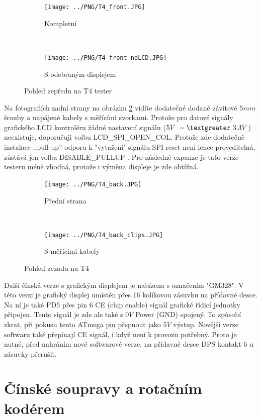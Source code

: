 \begin{figure}[H]
  \begin{subfigure}[b]{.5\textwidth}
    \centering
    \texttt{[image: ../PNG/T4\_front.JPG]}
    \caption{Kompletní}
  \end{subfigure}
  ~
  \begin{subfigure}[b]{.5\textwidth}
    \centering
    \texttt{[image: ../PNG/T4\_front\_noLCD.JPG]}
    \caption{S odebraným displejem}
  \end{subfigure}
  \caption{Pohled zepředu na T4 tester}
  \label{fig:T4_front}
\end{figure}

Na fotografiích zadní strany na obrázku \ref{fig:T4_back} vidíte dodatečné dodané
závitové \(5mm\) šrouby a napájené kabely s měřícími svorkami.
Protože pro datové signály grafického LCD kontroléru žádné nastavení
signálu (\(5V~-\textgreater ~3.3V\)) neexistuje, doporučuji volbu LCD\_SPI\_OPEN\_COL.
Protože zde dodatečně instalace ,,pull-up'' odporu k "vytažení" signálu SPI reset
není lehce proveditelná, zůstává jen volba DISABLE\_PULLUP . 
Pro následné expanze je tato verze testeru méně vhodná, protože i výměna displeje je zde obtížná.

\begin{figure}[H]
  \begin{subfigure}[b]{.5\textwidth}
    \centering
    \texttt{[image: ../PNG/T4\_back.JPG]}
    \caption{Přední strana}
  \end{subfigure}
  ~
  \begin{subfigure}[b]{.5\textwidth}
    \centering
    \texttt{[image: ../PNG/T4\_back\_clips.JPG]}
    \caption{S měřícími kabely}
  \end{subfigure}
  \caption{Pohled zezadu na T4}
  \label{fig:T4_back}
\end{figure}

Další čínská verze s grafickým displejem je nabízena s označením "GM328".
V této verzi je grafický displej umístěn přes 16 kolíkovou zásuvku na přídavné desce. Na ní je také
PD5 přes pin 6 CE (chip enable) signál grafické řídicí jednotky připojen. Tento signál je zde ale
také s \(0V\) Power (GND) spojený. 
To způsobí zkrat, při pokusu tento ATmega pin přepnout jako \(5V\) výstup.
Novější verze softwaru také přepínají CE signál, i když není k provozu potřebný.
Proto je nutné, před nahráním nové softwarové verze, na přídavné desce DPS kontakt 6 u zásuvky
přerušit.

\section{Čínské soupravy a rotačním kodérem}

